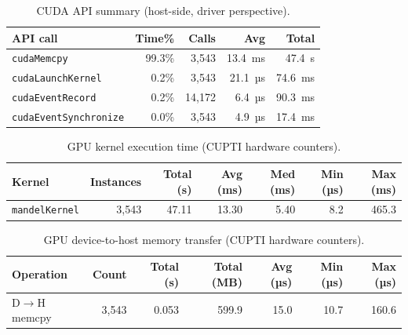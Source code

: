 \documentclass[
	english,
	letterpaper, oneside
]{article}
\begin{document}
\begin{table}[H]
    \centering
    \caption{CUDA API summary (host-side, driver perspective).}
    \label{tab:cuda-api}
    \begin{tabular}{lrrrr}
        \hline
        \textbf{API call} & \textbf{Time\%} & \textbf{Calls} & \textbf{Avg} & \textbf{Total} \\
        \hline
        \texttt{cudaMemcpy}          & 99.3\% & 3{,}543 & 13.4~ms    & 47.4~s   \\
        \texttt{cudaLaunchKernel}    &  0.2\% & 3{,}543 & 21.1~µs    & 74.6~ms  \\
        \texttt{cudaEventRecord}     &  0.2\% & 14{,}172& 6.4~µs     & 90.3~ms  \\
        \texttt{cudaEventSynchronize}&  0.0\% & 3{,}543 & 4.9~µs     & 17.4~ms  \\
        \hline
    \end{tabular}
\end{table}

\begin{table}[H]
    \centering
    \caption{GPU kernel execution time (CUPTI hardware counters).}
    \label{tab:gpu-kernel}
    \begin{tabular}{lrrrrrr}
        \hline
        \textbf{Kernel} & \textbf{Instances} & \textbf{Total (s)} & \textbf{Avg (ms)} & \textbf{Med (ms)} & \textbf{Min (µs)} & \textbf{Max (ms)} \\
        \hline
        \texttt{mandelKernel} & 3{,}543 & 47.11 & 13.30 & 5.40 & 8.2 & 465.3 \\
        \hline
    \end{tabular}
\end{table}

\begin{table}[H]
    \centering
    \caption{GPU device-to-host memory transfer (CUPTI hardware counters).}
    \label{tab:memcpy}
    \begin{tabular}{lrrrrrr}
        \hline
        \textbf{Operation} & \textbf{Count} & \textbf{Total (s)} & \textbf{Total (MB)} & \textbf{Avg (µs)} & \textbf{Min (µs)} & \textbf{Max (µs)} \\
        \hline
        D$\rightarrow$H memcpy & 3{,}543 & 0.053 & 599.9 & 15.0 & 10.7 & 160.6 \\
        \hline
    \end{tabular}
\end{table}

\end{document}
